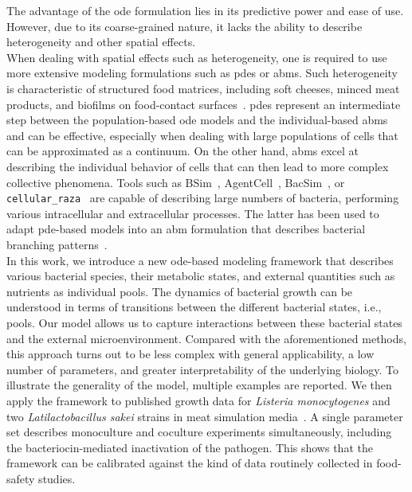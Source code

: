 \documentclass[10pt,1p,authoryear]{elsarticle}
\numberwithin{equation}{section}
\begin{document}
The advantage of the \ac{ode} formulation lies in its predictive power and ease of use.
However, due to its coarse-grained nature, it lacks the ability to describe heterogeneity and
other spatial effects.\\
%
When dealing with spatial effects such as heterogeneity, one is required to use more extensive
modeling formulations such as \acp{pde} or \acp{abm}.
Such heterogeneity is characteristic of structured food matrices, including soft cheeses, minced meat products, and biofilms on food-contact surfaces~\citep{cauchie_modeling_2020, mounier_microbial_2008}.
\acp{pde} represent an intermediate step between the population-based \ac{ode} models and the
individual-based \acp{abm} and can be effective, especially when dealing with large populations of
cells that can be approximated as a continuum.
On the other hand, \acp{abm} excel at describing the individual behavior of cells that can then lead to more complex collective phenomena.
Tools such as BSim~\citep{Gorochowski2012,Dang2020}, AgentCell~\citep{emonet_agentcell_2005}, BacSim~\citep{kreft_bacsim_1998}, or \texttt{cellular\_raza}~\citep{Pleyer2025} are
capable of describing large numbers of bacteria, performing various intracellular and extracellular
processes.
The latter has been used to adapt \ac{pde}-based models into an \ac{abm} formulation that describes bacterial branching patterns~\citep{Kawasaki1997,Matsushita1998}.\\
%
In this work, we introduce a new \ac{ode}-based modeling framework that describes various
bacterial species, their metabolic states, and external quantities such as nutrients as individual pools.
The dynamics of bacterial growth can be understood in terms of transitions between the different
bacterial states, i.e., pools. Our model allows us to capture interactions between these bacterial states and the external microenvironment.
Compared with the aforementioned methods, this approach turns out to be less complex with general applicability, a low number of parameters, and greater interpretability of the underlying biology.
To illustrate the generality of the model, multiple examples are reported.
We then apply the framework to published growth data for \textit{Listeria monocytogenes} and two
\textit{Latilactobacillus sakei} strains in meat simulation media~\citep{ferrer-bustinsAntilisterialEffect2024}.
A single parameter set describes monoculture and coculture experiments simultaneously, including
the bacteriocin-mediated inactivation of the pathogen. This shows that the framework can be
calibrated against the kind of data routinely collected in food-safety studies.
\end{document}
